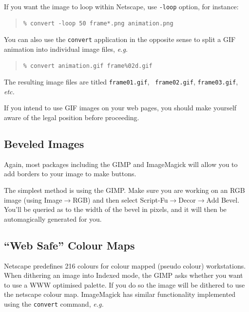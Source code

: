 \documentclass[twoside,11pt]{article}
\newcommand{\htmlref}[2]{#1}
\newcommand{\xlabel}[1]{}
\begin{document}
If you want the image to loop within Netscape, use {\tt -loop} option, for instance:

\small
\begin{quote}
\begin{verbatim}
% convert -loop 50 frame*.png animation.png
\end{verbatim}
\end{quote}
\normalsize

You can also use the {\tt convert} application in the opposite sense
to split a GIF animation into individual image files, {\em e.g.\ }

\small
\begin{quote}
\begin{verbatim}
% convert animation.gif frame%02d.gif
\end{verbatim}
\end{quote}
\normalsize

The resulting image files are titled {\tt frame01.gif}, {\tt
frame02.gif}, {\tt frame03.gif}, {\em etc.}

If you intend to use GIF images on your web pages, you should make
yourself aware of the \htmlref{legal position}{sc15_giflegal} before
proceeding.

\subsection{\xlabel{sc15_bevel}Beveled Images\label{sc15_bevel}}

Again, most packages including the \htmlref{GIMP}{sc15_gimp} and
\htmlref{ImageMagick}{sc15_magick} will allow you to add borders to
your image to make buttons.

The simplest method is using the GIMP. Make sure you are working on an
RGB image (using {\sc Image}$\rightarrow${RGB}) and then select {\sc
Script-Fu}$\rightarrow${\sc Decor}$\rightarrow${\sc Add Bevel}. You'll
be queried as to the width of the bevel in pixels, and it will then be
automagically generated for you.

\subsection{\xlabel{sc15_websafe}``Web Safe'' Colour Maps\label{sc15_websafe}}

Netscape predefines 216 colours for colour mapped (\htmlref{pseudo
colour}{sc15_pseudo}) workstations. When dithering an image into
Indexed mode, the \htmlref{GIMP}{sc15_gimp} asks whether you want to
use a WWW optimised palette. If you do so the image will be dithered
to use the netscape colour map. \htmlref{ImageMagick}{sc15_magick} has
similar functionality implemented using the {\tt convert} command,
{\em e.g.\ }
\end{document}
